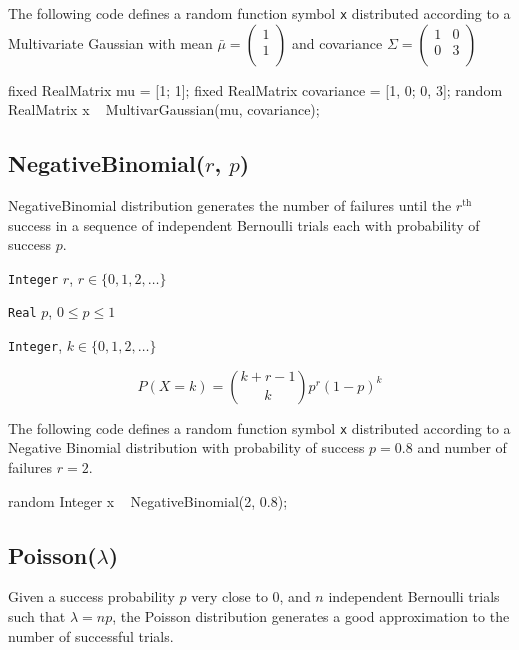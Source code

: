 The following code defines a random function symbol \verb|x| distributed according to a Multivariate Gaussian with mean $\bar{\mu} = 
\begin{pmatrix}
  1  \\
  1  \\ 
 \end{pmatrix}$ and covariance $\Sigma = 
 \begin{pmatrix}
   1 & 0 \\
   0 & 3 \\
  \end{pmatrix}
 $
\begin{blogcode}
fixed RealMatrix mu = [1; 1];
fixed RealMatrix covariance = [1, 0; 0, 3];
random RealMatrix x ~ MultivarGaussian(mu, covariance);
\end{blogcode}

\subsection{NegativeBinomial($r$, $p$)}
NegativeBinomial distribution generates the number of failures until the $r^{\text{th}}$ success in a sequence of independent Bernoulli trials each with probability of success $p$.

\begin{itemize*}
\item[] \verb|Integer| $r$, $r \in \{0, 1, 2, \ldots \}$
\item[] \verb|Real| $p$, $0 \leq p \leq 1$ 
\end{itemize*}

\begin{itemize*}
\item[] \verb|Integer|, $k \in \{0, 1, 2, \ldots \}$ 
\end{itemize*}

\[
	P(X = k) = \binom{k + r - 1}{k} p^{r} (1-p)^{k} 
\]

The following code defines a random function symbol \verb|x| distributed according to a Negative Binomial distribution with probability of success $p = 0.8$ and number of failures $r = 2$.
\begin{blogcode}
random Integer x ~ NegativeBinomial(2, 0.8);
\end{blogcode}


\subsection{Poisson($\lambda$)}
Given a success probability $p$ very close to $0$, and $n$ independent Bernoulli trials such that $\lambda = np$, the Poisson distribution generates a good approximation to the number of successful trials.

